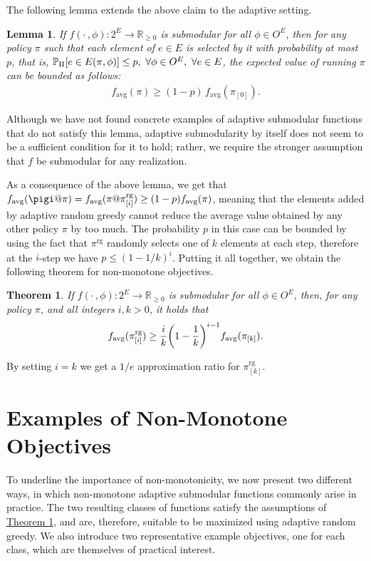 \documentclass{article}
\newcommand{\theoremref}[1]{\hyperref[#1]{Theorem \ref*{#1}}}
\newtheorem{theorem}{Theorem}
\newtheorem{lemma}{Lemma}
\let\originalleft\left
\let\originalright\right
\renewcommand{\left}{\mathopen{}\mathclose\bgroup\originalleft}
\renewcommand{\right}{\aftergroup\egroup\originalright}
\newcommand{\pio}{\pi_{[0]}}
\newcommand{\pik}{\pi_{[k]}}
\newcommand{\pig}{\pi^{\textrm{rg}}}
\newcommand{\pigi}{\pi^{\textrm{rg}}_{[i]}}
\newcommand{\pigk}{\pi^{\textrm{rg}}_{[k]}}
\newcommand{\favg}{f_{\mathrm{avg}}}
\begin{document}
The following lemma extends the above claim to the adaptive setting.
\begin{lemma}
  If $f(\cdot\,, \phi) : 2^E \to \mathbb{R}_{\geq 0}$ is submodular for all $\phi \in O^E$, then for any policy $\pi$ such that each element of $e \in E$ is selected by it with probability at most $p$, that is, $\P[\Pi]{e \in E(\pi, \phi)} \leq p,\ \forall \phi \in O^E,\ \forall e \in E$, the expected value of running $\pi$ can be bounded as follows:
\begin{align*}
  \favg(\pi) \geq (1-p)\,\favg(\pio).
\end{align*}
\end{lemma}
\noindent Although we have not found concrete examples of adaptive submodular functions that do not satisfy this lemma, adaptive submodularity by itself does not seem to be a sufficient condition for it to hold; rather, we require the stronger assumption that $f$ be submodular for any realization.

As a consequence of the above lemma, we get that $\favg(\pigi@\pi) = \favg(\pi@\pigi) \geq (1-p)\favg(\pi)$, meaning that the elements added by adaptive random greedy cannot reduce the average value obtained by any other policy $\pi$ by too much.
The probability $p$ in this case can be bounded by using the fact that $\pig$ randomly selects one of $k$ elements at each step, therefore at the $i$-step we have $p \leq (1-1/k)^i$.
Putting it all together, we obtain the following theorem for non-monotone objectives.
\begin{theorem}\label{thm:nonm}
  If $f(\cdot\,, \phi) : 2^E \to \mathbb{R}_{\geq 0}$ is submodular for all $\phi \in O^E$, then, for any policy $\pi$, and all integers $i, k > 0$, it holds that
  \begin{align*}
    \favg(\pigi) \geq \frac{i}{k}\left(1 - \frac{1}{k}\right)^{i-1}\favg(\pik).
  \end{align*}
\end{theorem}
\noindent By setting $i = k$ we get a $1/e$ approximation ratio for $\pigk$.

\section{Examples of Non-Monotone Objectives}
To underline the importance of non-monotonicity, we now present two different ways, in which non-monotone adaptive submodular functions commonly arise in practice.
The two resulting classes of functions satisfy the assumptions of \theoremref{thm:nonm}, and are, therefore, suitable to be maximized using adaptive random greedy.
We also introduce two representative example objectives, one for each class, which are themselves of practical interest.
\end{document}
